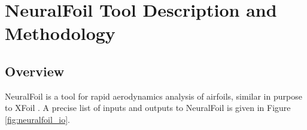     \section{NeuralFoil Tool Description and Methodology}
    \label{sec:methodology}

    \subsection{Overview}


    NeuralFoil is a tool for rapid aerodynamics analysis of airfoils, similar in purpose to XFoil \cite{drela_xfoil_1989}. A precise list of inputs and outputs to NeuralFoil is given in Figure \ref{fig:neuralfoil_io}.

